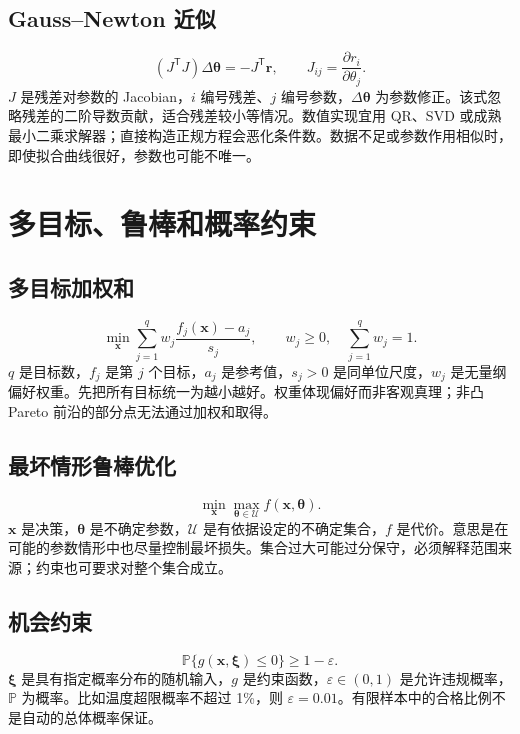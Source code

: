 \documentclass[UTF8,zihao=-4,openany,oneside,fontset=windows]{ctexbook}
\begin{document}
\subsection{Gauss--Newton 近似}
\begin{equation}(J^\mathsf TJ)\Delta\boldsymbol\theta=-J^\mathsf T\boldsymbol r,\qquad J_{ij}=\frac{\partial r_i}{\partial\theta_j}.\end{equation}
$J$ 是残差对参数的 Jacobian，$i$ 编号残差、$j$ 编号参数，$\Delta\boldsymbol\theta$ 为参数修正。该式忽略残差的二阶导数贡献，适合残差较小等情况。数值实现宜用 QR、SVD 或成熟最小二乘求解器；直接构造正规方程会恶化条件数。数据不足或参数作用相似时，即使拟合曲线很好，参数也可能不唯一。

\section{多目标、鲁棒和概率约束}
\subsection{多目标加权和}
\begin{equation}\min_{\boldsymbol x}\sum_{j=1}^q w_j\frac{f_j(\boldsymbol x)-a_j}{s_j},\qquad w_j\ge0,\quad\sum_{j=1}^q w_j=1.\end{equation}
$q$ 是目标数，$f_j$ 是第 $j$ 个目标，$a_j$ 是参考值，$s_j>0$ 是同单位尺度，$w_j$ 是无量纲偏好权重。先把所有目标统一为越小越好。权重体现偏好而非客观真理；非凸 Pareto 前沿的部分点无法通过加权和取得。
\subsection{最坏情形鲁棒优化}
\begin{equation}\min_{\boldsymbol x}\max_{\boldsymbol\theta\in\mathcal U} f(\boldsymbol x,\boldsymbol\theta).\end{equation}
$\boldsymbol x$ 是决策，$\boldsymbol\theta$ 是不确定参数，$\mathcal U$ 是有依据设定的不确定集合，$f$ 是代价。意思是在可能的参数情形中也尽量控制最坏损失。集合过大可能过分保守，必须解释范围来源；约束也可要求对整个集合成立。
\subsection{机会约束}
\begin{equation}\mathbb P\{g(\boldsymbol x,\boldsymbol\xi)\le0\}\ge1-\varepsilon.\end{equation}
$\boldsymbol\xi$ 是具有指定概率分布的随机输入，$g$ 是约束函数，$\varepsilon\in(0,1)$ 是允许违规概率，$\mathbb P$ 为概率。比如温度超限概率不超过 1\%，则 $\varepsilon=0.01$。有限样本中的合格比例不是自动的总体概率保证。
\end{document}
